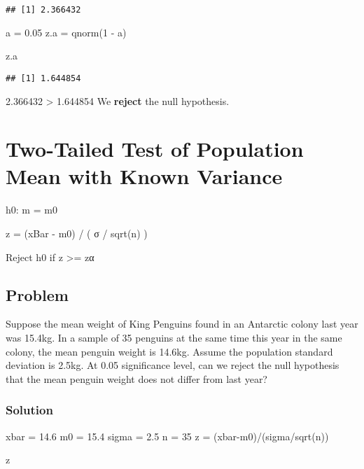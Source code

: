 \documentclass[
]{article}
\newenvironment{Shaded}{\begin{snugshade}}{\end{snugshade}}
\newcommand{\DecValTok}[1]{\textcolor[rgb]{0.00,0.00,0.81}{#1}}
\newcommand{\FloatTok}[1]{\textcolor[rgb]{0.00,0.00,0.81}{#1}}
\newcommand{\FunctionTok}[1]{\textcolor[rgb]{0.00,0.00,0.00}{#1}}
\newcommand{\NormalTok}[1]{#1}
\newcommand{\OtherTok}[1]{\textcolor[rgb]{0.56,0.35,0.01}{#1}}
\newcommand{\SpecialCharTok}[1]{\textcolor[rgb]{0.00,0.00,0.00}{#1}}
\begin{document}
\begin{verbatim}
## [1] 2.366432
\end{verbatim}

\begin{Shaded}
\begin{Highlighting}[]
\NormalTok{a }\OtherTok{=} \FloatTok{0.05} 
\NormalTok{z.a }\OtherTok{=} \FunctionTok{qnorm}\NormalTok{(}\DecValTok{1} \SpecialCharTok{{-}}\NormalTok{ a)}

\NormalTok{z.a}
\end{Highlighting}
\end{Shaded}

\begin{verbatim}
## [1] 1.644854
\end{verbatim}

2.366432 \textgreater{} 1.644854 We \textbf{reject} the null hypothesis.

\hypertarget{two-tailed-test-of-population-mean-with-known-variance}{%
\section{Two-Tailed Test of Population Mean with Known
Variance}\label{two-tailed-test-of-population-mean-with-known-variance}}

h0: m = m0

z = (xBar - m0) / ( σ / sqrt(n) )

Reject h0 if z \textgreater= \textbar{} zα \textbar{}

\hypertarget{problem-12}{%
\subsection{Problem}\label{problem-12}}

Suppose the mean weight of King Penguins found in an Antarctic colony
last year was 15.4kg. In a sample of 35 penguins at the same time this
year in the same colony, the mean penguin weight is 14.6kg. Assume the
population standard deviation is 2.5kg. At 0.05 significance level, can
we reject the null hypothesis that the mean penguin weight does not
differ from last year?

\hypertarget{solution-14}{%
\subsubsection{Solution}\label{solution-14}}

\begin{Shaded}
\begin{Highlighting}[]
\NormalTok{xbar }\OtherTok{=} \FloatTok{14.6}
\NormalTok{m0 }\OtherTok{=} \FloatTok{15.4}
\NormalTok{sigma }\OtherTok{=} \FloatTok{2.5}
\NormalTok{n }\OtherTok{=} \DecValTok{35}
\NormalTok{z }\OtherTok{=}\NormalTok{ (xbar}\SpecialCharTok{{-}}\NormalTok{m0)}\SpecialCharTok{/}\NormalTok{(sigma}\SpecialCharTok{/}\FunctionTok{sqrt}\NormalTok{(n))}

\NormalTok{z}
\end{Highlighting}
\end{Shaded}
\end{document}
